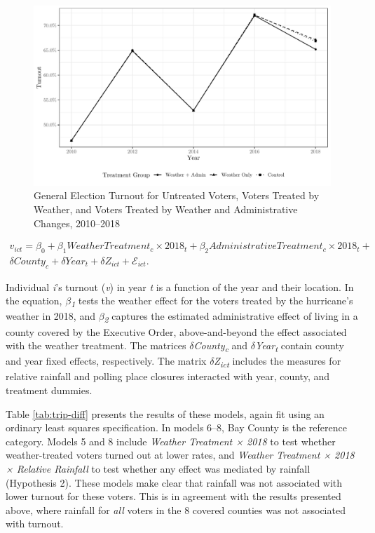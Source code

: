 \documentclass[
  12pt,
]{article}
\begin{document}
\begin{figure}[h]

{\centering \includegraphics{hurricane_michael_files/figure-latex/tripd-to-chunk-1} 

}

\caption{\label{fig:trip-diff-plot}General Election Turnout for Untreated Voters, Voters Treated by Weather, and Voters Treated by Weather and Administrative Changes, 2010--2018}\label{fig:tripd-to-chunk}
\end{figure}

\begin{gather}
\label{eq:1}
v_{ict}=\beta_0 + \beta_1Weather Treatment_{c}\times 2018_{t} +
\beta_2Administrative Treatment_{c}\times 2018_{t} + \nonumber \\
\delta{County}_{c} + \delta{Year}_{t} +
\delta{Z}_{ict} + \mathcal{E}_{ict}. 
\end{gather}

Individual \emph{i}'s turnout (\emph{v}) in year \emph{t} is a function of the year and their location. In the equation, \emph{\(\beta\)\textsubscript{1}} tests the weather effect for the voters treated by the hurricane's weather in 2018, and \emph{\(\beta\)\textsubscript{2}} captures the estimated administrative effect of living in a county covered by the Executive Order, above-and-beyond the effect associated with the weather treatment. The matrices \emph{\(\delta\)County\textsubscript{c}} and \emph{\(\delta\)Year\textsubscript{t}} contain county and year fixed effects, respectively. The matrix \emph{\(\delta\)Z\textsubscript{ict}} includes the measures for relative rainfall and polling place closures interacted with year, county, and treatment dummies.

Table \ref{tab:trip-diff} presents the results of these models, again fit using an ordinary least squares specification. In models 6--8, Bay County is the reference category. Models 5 and 8 include \emph{Weather Treatment × 2018} to test whether weather-treated voters turned out at lower rates, and \emph{Weather Treatment × 2018 × Relative Rainfall} to test whether any effect was mediated by rainfall (Hypothesis 2). These models make clear that rainfall was not associated with lower turnout for these voters. This is in agreement with the results presented above, where rainfall for \emph{all} voters in the 8 covered counties was not associated with turnout.
\end{document}
